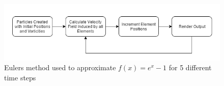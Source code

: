 \begin{figure}[H]
\centering
\includegraphics[width=1.0\textwidth]{Figures/Algorithm.png}
\caption{\label{fig:Algorithm} Eulers method used to approximate $f(x)=e^x-1$ for 5 different time steps}
\end{figure} 







